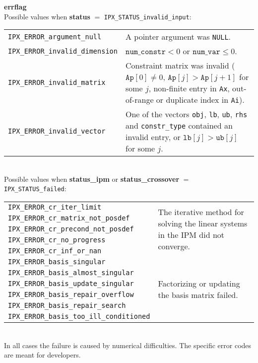 \documentclass{article}
\newcommand{\ct}{\texttt}
\newcommand{\info}[2]{
  \noindent\begin{minipage}{\textwidth}
    \textbf{#1}\\
    #2
  \end{minipage}
  \vskip 1\baselineskip
}
\begin{document}
\info{errflag}{
  Possible values when \textbf{status} $=$
  \ct{IPX\_STATUS\_invalid\_input}:\\[1em]
  \begin{tabular}{lp{8cm}}
    \ct{IPX\_ERROR\_argument\_null} & A pointer argument was \ct{NULL}.\\
    \ct{IPX\_ERROR\_invalid\_dimension} & $\ct{num\_constr}<0$ or
    $\ct{num\_var}\le0$.\\
    \ct{IPX\_ERROR\_invalid\_matrix} & Constraint matrix was invalid
    ($\ct{Ap}[0]\neq0$, $\ct{Ap}[j]>\ct{Ap}[j+1]$ for some $j$, non-finite entry
    in \ct{Ax}, out-of-range or duplicate index in \ct{Ai}).\\
    \ct{IPX\_ERROR\_invalid\_vector} & One of the vectors \ct{obj}, \ct{lb},
    \ct{ub}, \ct{rhs} and \ct{constr\_type} contained an invalid entry, or
    $\ct{lb}[j]>\ct{ub}[j]$ for some $j$.\\
  \end{tabular}\\[1.5em]

  Possible values when \textbf{status\_ipm} or \textbf{status\_crossover} $=$
  \ct{IPX\_STATUS\_failed}:\\[1em]
  \begin{tabular}{lp{8cm}}
    \ct{IPX\_ERROR\_cr\_iter\_limit} &
    \multirow{5}{8cm}{The iterative method for solving the linear systems in the
      IPM did not converge.}\\
    \ct{IPX\_ERROR\_cr\_matrix\_not\_posdef} &\\
    \ct{IPX\_ERROR\_cr\_precond\_not\_posdef} &\\
    \ct{IPX\_ERROR\_cr\_no\_progress} &\\
    \ct{IPX\_ERROR\_cr\_inf\_or\_nan} &\\[1em]
    \ct{IPX\_ERROR\_basis\_singular} &
    \multirow{6}{8cm}{Factorizing or updating the basis matrix failed.}\\
    \ct{IPX\_ERROR\_basis\_almost\_singular} &\\
    \ct{IPX\_ERROR\_basis\_update\_singular} &\\
    \ct{IPX\_ERROR\_basis\_repair\_overflow} &\\
    \ct{IPX\_ERROR\_basis\_repair\_search} &\\
    \ct{IPX\_ERROR\_basis\_too\_ill\_conditioned}
  \end{tabular}\\[1em]
  In all cases the failure is caused by numerical difficulties. The specific
  error codes are meant for developers.
}
\end{document}
